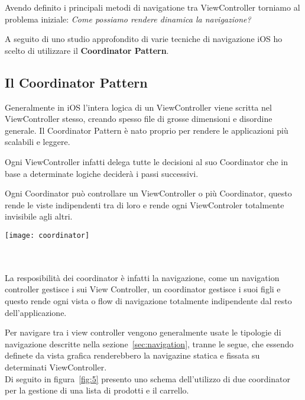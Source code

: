 Avendo definito i principali metodi di navigatione tra ViewController torniamo al problema iniziale:
\textit{Come possiamo rendere dinamica la navigazione?}

A seguito di uno studio approfondito di varie tecniche di navigazione iOS ho scelto di utilizzare il
\textbf{Coordinator Pattern}\cite{coordinatorpattern}.

\subsection{Il Coordinator Pattern}

Generalmente in iOS l'intera logica di un ViewController viene scritta nel ViewController stesso, creando spesso
file di grosse dimensioni e disordine generale. Il Coordinator Pattern è nato proprio per rendere 
le applicazioni più scalabili e leggere. 

Ogni ViewController infatti delega tutte le decisioni al suo Coordinator che in base a determinate logiche deciderà
i passi successivi.

Ogni Coordinator può controllare un ViewController o più Coordinator, questo rende le viste
indipendenti tra di loro e rende ogni ViewControler totalmente invisibile agli altri.\\

\begin{minipage}{\linewidth}
    \centering
    \texttt{[image: coordinator]}
    \label{fig:4}
\end{minipage}\\ \\

La resposibilità dei coordinator è infatti la navigazione, come un navigation controller gestisce i sui View Controller, un coordinator gestisce
i suoi figli e questo rende ogni vista o flow di navigazione totalmente indipendente dal resto dell'applicazione.

Per navigare tra i view controller vengono generalmente usate le tipologie di navigazione
descritte nella sezione~\ref{sec:navigation}, tranne le segue, che essendo definete da vista grafica renderebbero
la navigazine statica e fissata su determinati ViewController. \\

Di seguito in figura~\ref{fig:5} presento uno schema dell'utilizzo di due coordinator
per la gestione di una lista di prodotti e il carrello. \\

